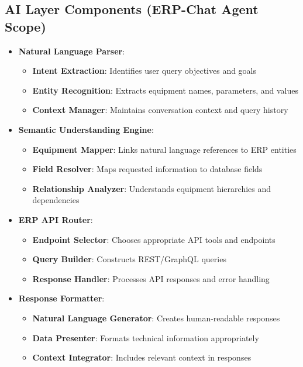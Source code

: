 \documentclass[12pt]{report}
\begin{document}
\subsection{AI Layer Components (ERP-Chat Agent Scope)}
\begin{itemize}
  \item \textbf{Natural Language Parser}:
    \begin{itemize}
      \item \textbf{Intent Extraction}: Identifies user query objectives and goals
      \item \textbf{Entity Recognition}: Extracts equipment names, parameters, and values
      \item \textbf{Context Manager}: Maintains conversation context and query history
    \end{itemize}
  \item \textbf{Semantic Understanding Engine}:
    \begin{itemize}
      \item \textbf{Equipment Mapper}: Links natural language references to ERP entities
      \item \textbf{Field Resolver}: Maps requested information to database fields
      \item \textbf{Relationship Analyzer}: Understands equipment hierarchies and dependencies
    \end{itemize}
  \item \textbf{ERP API Router}:
    \begin{itemize}
      \item \textbf{Endpoint Selector}: Chooses appropriate API tools and endpoints
      \item \textbf{Query Builder}: Constructs REST/GraphQL queries
      \item \textbf{Response Handler}: Processes API responses and error handling
    \end{itemize}
  \item \textbf{Response Formatter}:
    \begin{itemize}
      \item \textbf{Natural Language Generator}: Creates human-readable responses
      \item \textbf{Data Presenter}: Formats technical information appropriately
      \item \textbf{Context Integrator}: Includes relevant context in responses
    \end{itemize}
\end{itemize}
\end{document}
